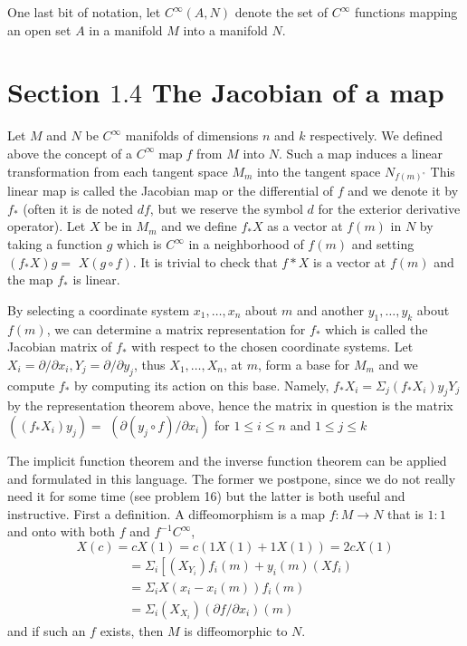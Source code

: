 \documentclass[10pt]{article}
\begin{document}
One last bit of notation, let $C^{\infty}(A, N)$ denote the set of $C^{\infty}$ functions mapping an open set $A$ in a manifold $M$ into a manifold $N$.



\section{Section $1.4$ The Jacobian of a map}
Let $M$ and $N$ be $C^{\infty}$ manifolds of dimensions $n$ and $k$ respectively. We defined above the concept of a $C^{\infty} \operatorname{map} f$ from $M$ into $N$. Such a map induces a linear transformation from each tangent space $M_{m}$ into the tangent space $N_{f(m)^{\circ}}$ This linear map is called the Jacobian map or the differential of $f$ and we denote it by $f_{*}$ (often it is de noted $d f$, but we reserve the symbol $d$ for the exterior derivative operator). Let $X$ be in $M_{m}$ and we define $f_{*} X$ as a vector at $f(m)$ in $N$ by taking a function $g$ which is $C^{\infty}$ in a neighborhood of $f(m)$ and setting $\left(f_{*} X\right) g=$ $X(g \circ f)$. It is trivial to check that $f * X$ is a vector at $f(m)$ and the map $f_{*}$ is linear.

By selecting a coordinate system $x_{1}, \ldots, x_{n}$ about $m$ and another $y_{1}, \ldots, y_{k}$ about $f(m)$, we can determine a matrix representation for $f_{*}$ which is called the Jacobian matrix of $f_{*}$ with respect to the chosen coordinate systems. Let $X_{i}=\partial / \partial x_{i}, Y_{j}=\partial / \partial y_{j}$, thus $X_{1}, \ldots, X_{n}$, at $m$, form a base for $M_{m}$ and we compute $f_{*}$ by computing its action on this base. Namely, $f_{*} X_{i}=\Sigma_{j}\left(f_{*} X_{i}\right) y_{j} Y_{j}$ by the representation theorem above, hence the matrix in question is the matrix $\left(\left(f_{*} X_{i}\right) y_{j}\right)=$ $\left(\partial\left(y_{j} \circ f\right) / \partial x_{i}\right)$ for $1 \leq i \leq n$ and $1 \leq j \leq k$

The implicit function theorem and the inverse function theorem can be applied and formulated in this language. The former we postpone, since we do not really need it for some time (see problem 16) but the latter is both useful and instructive. First a definition. A diffeomorphism is a map $f: M \rightarrow N$ that is $1: 1$ and onto with both $f$ and $f^{-1} C^{\infty}$,
$$
X(c)=c X(1)=c(1 X(1)+1 X(1))=2 c X(1)
$$
$$
\begin{aligned}
&=\Sigma_{i}\left[\left(X_{Y_{i}}\right) f_{i}(m)+y_{i}(m)\left(X f_{i}\right)\right. \\
&=\Sigma_{i} X\left(x_{i}-x_{i}(m)\right) f_{i}(m) \\
&=\Sigma_{i}\left(X_{X_{i}}\right)\left(\partial f / \partial x_{i}\right)(m)
\end{aligned}
$$
and if such an $f$ exists, then $M$ is diffeomorphic to $N$.
\end{document}
